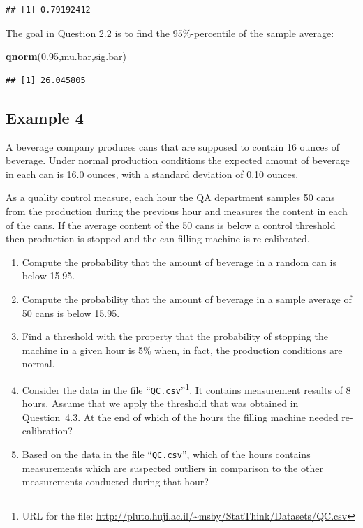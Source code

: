 \documentclass[]{krantz}
\makeatletter
\newenvironment{Shaded}{\begin{snugshade}}{\end{snugshade}}
\newcommand{\FloatTok}[1]{\textcolor[rgb]{0.00,0.00,0.81}{#1}}
\newcommand{\KeywordTok}[1]{\textcolor[rgb]{0.13,0.29,0.53}{\textbf{#1}}}
\newcommand{\NormalTok}[1]{#1}
\newenvironment{kframe}{%
\medskip{}
\setlength{\fboxsep}{.8em}
 \def\at@end@of@kframe{}%
 \ifinner\ifhmode%
  \def\at@end@of@kframe{\end{minipage}}%
  \begin{minipage}{\columnwidth}%
 \fi\fi%
 \def\FrameCommand##1{\hskip\@totalleftmargin \hskip-\fboxsep
 \colorbox{shadecolor}{##1}\hskip-\fboxsep
     \hskip-\linewidth \hskip-\@totalleftmargin \hskip\columnwidth}%
 \MakeFramed {\advance\hsize-\width
   \@totalleftmargin\z@ \linewidth\hsize
   \@setminipage}}%
 {\par\unskip\endMakeFramed%
 \at@end@of@kframe}
\renewenvironment{Shaded}{\begin{kframe}}{\end{kframe}}
\theoremstyle{definition}
\theoremstyle{definition}
\theoremstyle{definition}
\theoremstyle{remark}
\makeatother
\begin{document}
\begin{verbatim}
## [1] 0.79192412
\end{verbatim}

The goal in Question 2.2 is to find the 95\%-percentile of the sample
average:

\begin{Shaded}
\begin{Highlighting}[]
\KeywordTok{qnorm}\NormalTok{(}\FloatTok{0.95}\NormalTok{,mu.bar,sig.bar)}
\end{Highlighting}
\end{Shaded}

\begin{verbatim}
## [1] 26.045805
\end{verbatim}

\hypertarget{example-4}{%
\subsection{Example 4}\label{example-4}}

A beverage company produces cans that are supposed to contain 16 ounces
of beverage. Under normal production conditions the expected amount of
beverage in each can is 16.0 ounces, with a standard deviation of 0.10
ounces.

As a quality control measure, each hour the QA department samples 50
cans from the production during the previous hour and measures the
content in each of the cans. If the average content of the 50 cans is
below a control threshold then production is stopped and the can filling
machine is re-calibrated.

\begin{enumerate}
\def\labelenumi{\arabic{enumi}.}
\item
  Compute the probability that the amount of beverage in a random can
  is below 15.95.
\item
  Compute the probability that the amount of beverage in a sample
  average of 50 cans is below 15.95.
\item
  Find a threshold with the property that the probability of stopping
  the machine in a given hour is 5\% when, in fact, the production
  conditions are normal.
\item
  Consider the data in the file ``\texttt{QC.csv}''\footnote{URL for the file:
    \url{http://pluto.huji.ac.il/~msby/StatThink/Datasets/QC.csv}}. It contains
  measurement results of 8 hours. Assume that we apply the threshold
  that was obtained in Question~4.3. At the end of which of the hours
  the filling machine needed re-calibration?
\item
  Based on the data in the file ``\texttt{QC.csv}'', which of the hours
  contains measurements which are suspected outliers in comparison to
  the other measurements conducted during that hour?
\end{enumerate}
\end{document}
